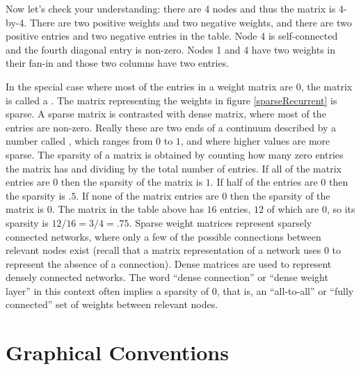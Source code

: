 \noindent Now let's check your understanding: there are 4 nodes and thus the matrix is 4-by-4. There are two positive weights and two negative weights, and there are two positive entries and two negative entries in the table. Node 4 is self-connected and the fourth diagonal entry is non-zero. Nodes 1 and 4 have two weights in their fan-in and those two columns have two entries.

In the special case where most of the entries in a weight matrix are $0$, the matrix is called a . The matrix representing the weights in figure \ref{sparseRecurrent} is sparse. A sparse matrix is contrasted with dense matrix, where most of the entries are non-zero. Really these are two ends of a continuum described by a number called , which ranges from $0$ to $1$, and where higher values are more sparse. The sparsity of a matrix is obtained by counting how many zero entries the matrix has and dividing by the total number of entries. If all of the matrix entries are $0$ then the sparsity of the matrix is $1$. If half of the entries are $0$ then the sparsity is $.5$. If none of the matrix entries are $0$ then the sparsity of the matrix is $0$. The matrix in the table above has $16$ entries, $12$ of which are $0$, so its sparsity is $12/16 = 3/4 = .75$. Sparse weight matrices represent sparsely connected networks, where only a few of the possible connections between relevant nodes exist (recall that a matrix representation of a network uses $0$ to represent the absence of a connection). Dense matrices are used to represent densely connected networks. The word ``dense connection'' or ``dense weight layer'' in this context often implies a sparsity of $0$, that is, an ``all-to-all'' or ``fully connected'' set of weights between relevant nodes.

\section{Graphical Conventions}\label{sourceTarget} 



